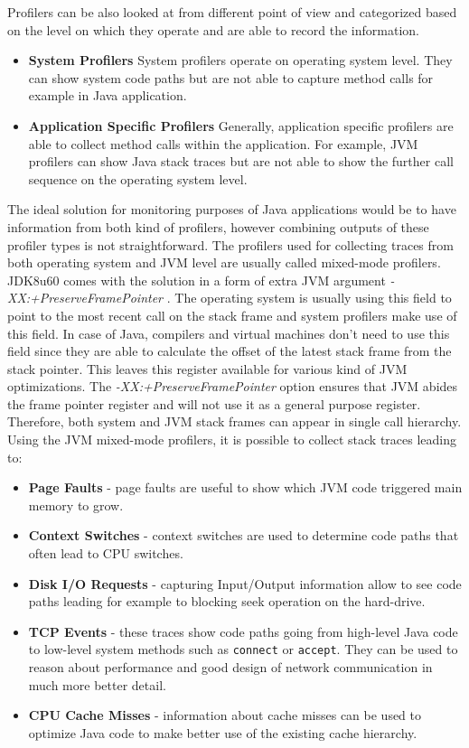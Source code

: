 Profilers can be also looked at from different point of view and categorized based on the level on which they operate and are able to record the information.
\begin{itemize}
	\item \textbf{System Profilers} \newline
	System profilers operate on operating system level. They can show system code paths but are not able to capture method calls for example in Java application.
	\item \textbf{Application Specific Profilers} \newline
	Generally, application specific profilers are able to collect method calls within the application. For example, JVM profilers can show Java stack traces but are not able to show the further call sequence on the operating system level.

\end{itemize}
The ideal solution for monitoring purposes of Java applications would be to have information from both kind of profilers, however combining outputs of these profiler types is not straightforward. The profilers used for collecting traces from both operating system and JVM level are usually called mixed-mode profilers. JDK8u60 comes with the solution in a form of extra JVM argument \textit{-XX:+PreserveFramePointer} \cite{MixedModeProfilers}. The operating system is usually using this field to point to the most recent call on the stack frame and system profilers make use of this field. In case of Java, compilers and virtual machines don't need to use this field since they are able to calculate the offset of the latest stack frame from the stack pointer. This leaves this register available for various kind of JVM optimizations. The \textit{-XX:+PreserveFramePointer}  option ensures that JVM abides the frame pointer register and will not use it as a general purpose register. Therefore, both system and JVM stack frames can appear in single call hierarchy. Using the JVM mixed-mode profilers, it is possible to collect stack traces leading to:
\begin{itemize}
	\item \textbf{Page Faults} - page faults are useful to show which JVM code triggered main memory to grow.
	\item \textbf{Context Switches} - context switches are used to determine code paths that often lead to CPU switches.
	\item\textbf{Disk I/O Requests} - capturing Input/Output information allow to see code paths leading for example to blocking seek operation on the hard-drive.
	\item \textbf{TCP Events} - these traces show code paths going from high-level Java code to low-level system methods such as \texttt{connect} or \texttt{accept}. They can be used to reason about performance and good design of network communication in much more better detail.
	\item \textbf{CPU Cache Misses} - information about cache misses can be used to optimize Java code to make better use of the existing cache hierarchy.
\end{itemize}

